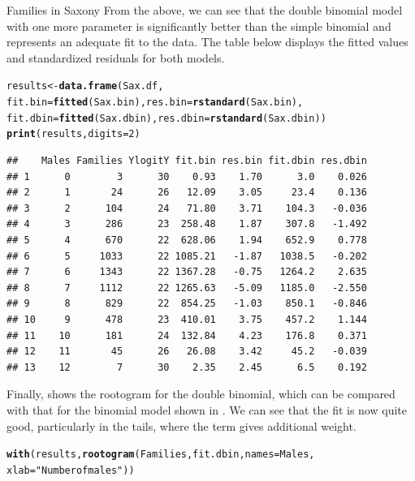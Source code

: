 \documentclass[11pt]{book}\usepackage[]{graphicx}\usepackage[]{color}
\makeatletter
\newcommand{\hlnum}[1]{\textcolor[rgb]{0.686,0.059,0.569}{#1}}%
\newcommand{\hlstr}[1]{\textcolor[rgb]{0.192,0.494,0.8}{#1}}%
\newcommand{\hlstd}[1]{\textcolor[rgb]{0.345,0.345,0.345}{#1}}%
\newcommand{\hlkwb}[1]{\textcolor[rgb]{0.69,0.353,0.396}{#1}}%
\newcommand{\hlkwc}[1]{\textcolor[rgb]{0.333,0.667,0.333}{#1}}%
\newcommand{\hlkwd}[1]{\textcolor[rgb]{0.737,0.353,0.396}{\textbf{#1}}}%
\newenvironment{kframe}{%
 \def\at@end@of@kframe{}%
 \ifinner\ifhmode%
  \def\at@end@of@kframe{\end{minipage}}%
  \begin{minipage}{\columnwidth}%
 \fi\fi%
 \def\FrameCommand##1{\hskip\@totalleftmargin \hskip-\fboxsep
 \colorbox{shadecolor}{##1}\hskip-\fboxsep
     \hskip-\linewidth \hskip-\@totalleftmargin \hskip\columnwidth}%
 \MakeFramed {\advance\hsize-\width
   \@totalleftmargin\z@ \linewidth\hsize
   \@setminipage}}%
 {\par\unskip\endMakeFramed%
 \at@end@of@kframe}
\newenvironment{knitrout}{}{} %
\renewenvironment{knitrout}{\small\renewcommand{\baselinestretch}{.85}}{} %
\makeatother
\begin{document}
\begin{Example}[saxony2]{Families in Saxony}
From the above, we can see that 
the double binomial model  with one more parameter
is significantly better than the simple binomial
and represents an adequate fit to the data.  The table below
displays the fitted values and standardized residuals for both models.
\begin{knitrout}
\color{fgcolor}\begin{kframe}
\begin{alltt}
\hlstd{results} \hlkwb{<-} \hlkwd{data.frame}\hlstd{(Sax.df,}
          \hlkwc{fit.bin}\hlstd{=}\hlkwd{fitted}\hlstd{(Sax.bin),} \hlkwc{res.bin}\hlstd{=}\hlkwd{rstandard}\hlstd{(Sax.bin),}
          \hlkwc{fit.dbin}\hlstd{=}\hlkwd{fitted}\hlstd{(Sax.dbin),} \hlkwc{res.dbin}\hlstd{=}\hlkwd{rstandard}\hlstd{(Sax.dbin))}
\hlkwd{print}\hlstd{(results,} \hlkwc{digits}\hlstd{=}\hlnum{2}\hlstd{)}
\end{alltt}
\begin{verbatim}
##    Males Families YlogitY fit.bin res.bin fit.dbin res.dbin
## 1      0        3      30    0.93    1.70      3.0    0.026
## 2      1       24      26   12.09    3.05     23.4    0.136
## 3      2      104      24   71.80    3.71    104.3   -0.036
## 4      3      286      23  258.48    1.87    307.8   -1.492
## 5      4      670      22  628.06    1.94    652.9    0.778
## 6      5     1033      22 1085.21   -1.87   1038.5   -0.202
## 7      6     1343      22 1367.28   -0.75   1264.2    2.635
## 8      7     1112      22 1265.63   -5.09   1185.0   -2.550
## 9      8      829      22  854.25   -1.03    850.1   -0.846
## 10     9      478      23  410.01    3.75    457.2    1.144
## 11    10      181      24  132.84    4.23    176.8    0.371
## 12    11       45      26   26.08    3.42     45.2   -0.039
## 13    12        7      30    2.35    2.45      6.5    0.192
\end{verbatim}
\end{kframe}
\end{knitrout}

Finally,  shows the rootogram for the double
binomial, which can be compared with that for the binomial model
shown in .  We can see that the fit is now
quite good, particularly in the tails, where the term 
gives additional weight.
\begin{knitrout}
\color{fgcolor}\begin{kframe}
\begin{alltt}
\hlkwd{with}\hlstd{(results,} \hlkwd{rootogram}\hlstd{(Families, fit.dbin,} \hlkwc{names}\hlstd{=Males,}
                        \hlkwc{xlab}\hlstd{=}\hlstr{"Number of males"}\hlstd{))}
\end{alltt}
\end{kframe}\begin{figure}[htbp]



\end{figure}
\end{knitrout}
\end{Example}
\end{document}
